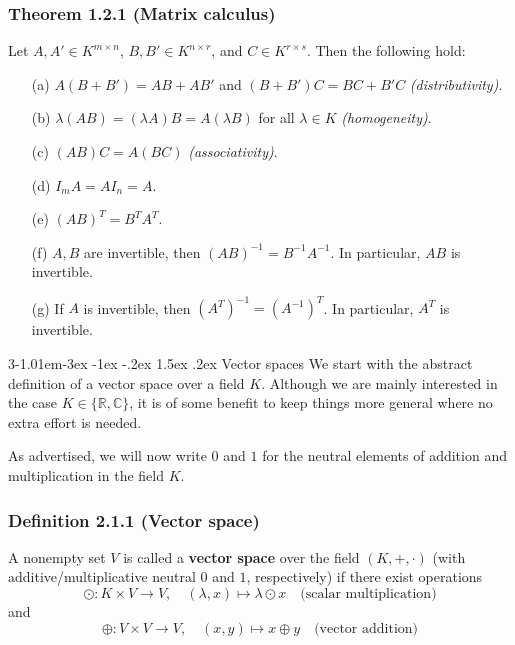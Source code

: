 \documentclass{tufte-handout}
\makeatletter
\renewcommand{\section}{\@startsection{section}%
    {3}{-1.01em}{-3ex \@plus -1ex \@minus -.2ex}%
    {1.5ex \@plus .2ex}
    {\hspace*{-5.5em}\fcolorbox{blue}{blue}{\parbox[c][1.0ex][b]{4em}{\phantom{space}}}
    \normalfont\Large\itshape\color{blue}}}
\makeatother
\begin{document}
\subsubsection*{Theorem 1.2.1 (Matrix calculus)}
Let $A, A' \in K^{m \times n}$, $B, B' \in K^{n \times r}$, and $C \in K^{r \times s}$. Then the following hold:
\begin{enumerate}
    \item[(a)] $A(B + B') = AB + AB'$ and $(B + B')C = BC + B'C$ \hfill \textit{(distributivity)}.
    \item[(b)] $\lambda(AB) = (\lambda A)B = A(\lambda B)$ for all $\lambda \in K$ \hfill \textit{(homogeneity)}.
    \item[(c)] $(AB)C = A(BC)$ \hfill \textit{(associativity)}.
    \item[(d)] $I_m A = AI_n = A$.
    \item[(e)] $(AB)^T = B^T A^T$.
    \item[(f)] $A, B$ are invertible, then $(AB)^{-1} = B^{-1}A^{-1}$. In particular, $AB$ is invertible.
    \item[(g)] If $A$ is invertible, then $(A^T)^{-1} = (A^{-1})^T$. In particular, $A^T$ is invertible.
\end{enumerate}



\section{Vector spaces}
We start with the abstract definition of a vector space over a field $K$. Although we are mainly interested in the case $K \in \{\mathbb{R}, \mathbb{C}\}$, it is of some benefit to keep things more general where no extra effort is needed.

As advertised, we will now write $0$ and $1$ for the neutral elements of addition and multiplication in the field $K$.

\subsubsection*{Definition 2.1.1 (Vector space)}
A nonempty set $V$ is called a \textbf{vector space} over the field $(K, +, \cdot)$ (with additive/multiplicative neutral $0$ and $1$, respectively) if there exist operations
\[
\odot : K \times V \to V, \quad (\lambda, x) \mapsto \lambda \odot x \quad \text{(scalar multiplication)}
\]
and
\[
\oplus : V \times V \to V, \quad (x, y) \mapsto x \oplus y \quad \text{(vector addition)}
\]
\end{document}
